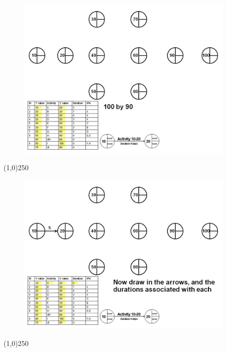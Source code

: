 \begin{frame}
\begin{figure}
	\centering
		\includegraphics[width = 10.5cm]{oldnotes/Slide90.jpg}
\end{figure}
\end{frame}
\begin{center}\line(1,0){250}\end{center}


\begin{frame}
\begin{figure}
	\centering
		\includegraphics[width = 10.5cm]{oldnotes/Slide91.jpg}
\end{figure}
\end{frame}
\begin{center}\line(1,0){250}\end{center}


